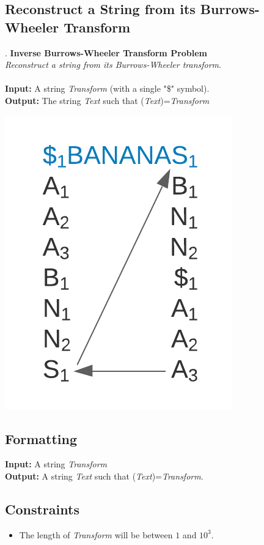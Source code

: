 \documentclass{article}
\renewcommand{\sc}[1]{\text{\scshape #1}}
\begin{document}
\subsection{Reconstruct a String from its Burrows-Wheeler Transform}.
\hline\vspace{5}
\noindent\textbf{Inverse Burrows-Wheeler Transform Problem}\\
\emph{Reconstruct a string from its Burrows-Wheeler transform}.\\ \\
\textbf{Input:} A string \emph{Transform} (with a single "\$" symbol). \\
\textbf{Output:} The string \emph{Text} such that \sc{BWT}(\emph{Text})=\emph{Transform}
\begin{center}
    \includegraphics[scale=0.2]{c9/logos/9J.png} 
\end{center}
\hline\vspace{5}

\subsection*{Formatting}
\noindent\textbf{Input:} A string \emph{Transform}\\
\noindent\textbf{Output:} A string \emph{Text} such that \sc{BWT}(\emph{Text})=\emph{Transform}.

\subsection*{Constraints}
\begin{itemize}
    \item The length of \emph{Transform} will be between $1$ and $10^3$.
\end{itemize}
\pagebreak
\end{document}
